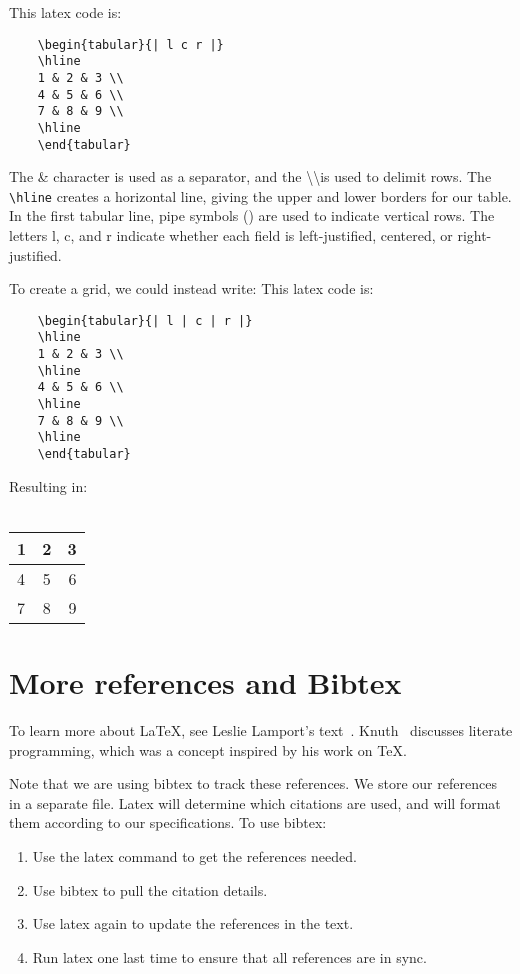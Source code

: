 \documentclass{article}
\begin{document}
\smallskip

This latex code is:
\begin{verbatim}
    \begin{tabular}{| l c r |}
    \hline
    1 & 2 & 3 \\
    4 & 5 & 6 \\
    7 & 8 & 9 \\
    \hline
    \end{tabular}
\end{verbatim}

The \& character is used as a separator,
and the \textbackslash\textbackslash is used to delimit rows.
The {\tt {\textbackslash}hline} creates a horizontal line,
giving the upper and lower borders for our table.
In the first tabular line, pipe symbols (\textbar) are used to indicate vertical rows.
The letters l, c, and r indicate whether each field is left-justified, centered,
or right-justified.

To create a grid, we could instead write:
This latex code is:

\begin{verbatim}
    \begin{tabular}{| l | c | r |}
    \hline
    1 & 2 & 3 \\
    \hline
    4 & 5 & 6 \\
    \hline
    7 & 8 & 9 \\
    \hline
    \end{tabular}
\end{verbatim}

\noindent
Resulting in:~\\~\\

    \begin{tabular}{| l | c | r |}
    \hline
    1 & 2 & 3 \\
    \hline
    4 & 5 & 6 \\
    \hline
    7 & 8 & 9 \\
    \hline
    \end{tabular}


\section{More references and Bibtex}\label{sec:bibtex}
To learn more about LaTeX,
see Leslie Lamport's text~\cite{lamport}.
Knuth~\cite{literate} discusses literate programming,
which was a concept inspired by his work on TeX.

Note that we are using bibtex to track these references.
We store our references in a separate file.
Latex will determine which citations are used,
and will format them according to our specifications.
To use bibtex:
\begin{enumerate}
\item Use the latex command  to get the references needed.
\item Use bibtex to pull the citation details.
\item Use latex again to update the  references in the text.
\item Run latex one last time to ensure that all references are in sync.
\end{enumerate}
\end{document}
